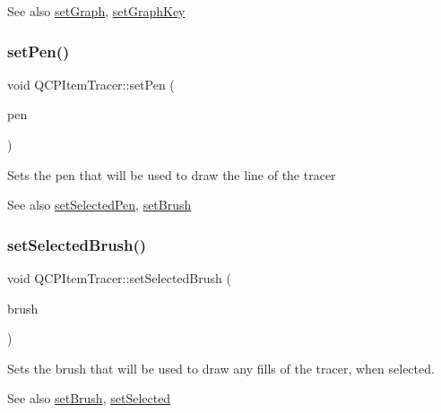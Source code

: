 \begin{DoxySeeAlso}{See also}
\hyperlink{class_q_c_p_item_tracer_af5886f4ded8dd68cb4f3388f390790c0}{set\+Graph}, \hyperlink{class_q_c_p_item_tracer_a6840143b42f3b685cedf7c6d83a704c8}{set\+Graph\+Key} 
\end{DoxySeeAlso}
\mbox{\label{class_q_c_p_item_tracer_af8048636fc1ef0152e51809b008df2ca}} 
\subsubsection{\texorpdfstring{set\+Pen()}{setPen()}}
{\footnotesize\ttfamily void Q\+C\+P\+Item\+Tracer\+::set\+Pen (\begin{DoxyParamCaption}\item[{const Q\+Pen \&}]{pen }\end{DoxyParamCaption})}

Sets the pen that will be used to draw the line of the tracer

\begin{DoxySeeAlso}{See also}
\hyperlink{class_q_c_p_item_tracer_ae1bf70db7f13f928660168cd3e5069f3}{set\+Selected\+Pen}, \hyperlink{class_q_c_p_item_tracer_a2c303f7470a30084daa201ed556b3c36}{set\+Brush} 
\end{DoxySeeAlso}
\mbox{\label{class_q_c_p_item_tracer_a0f55c084980a7a312af859d3e7b558ef}} 
\subsubsection{\texorpdfstring{set\+Selected\+Brush()}{setSelectedBrush()}}
{\footnotesize\ttfamily void Q\+C\+P\+Item\+Tracer\+::set\+Selected\+Brush (\begin{DoxyParamCaption}\item[{const Q\+Brush \&}]{brush }\end{DoxyParamCaption})}

Sets the brush that will be used to draw any fills of the tracer, when selected.

\begin{DoxySeeAlso}{See also}
\hyperlink{class_q_c_p_item_tracer_a2c303f7470a30084daa201ed556b3c36}{set\+Brush}, \hyperlink{class_q_c_p_abstract_item_a203de94ad586cc44d16c9565f49d3378}{set\+Selected} 
\end{DoxySeeAlso}
\mbox{\label{class_q_c_p_item_tracer_ae1bf70db7f13f928660168cd3e5069f3}} 
